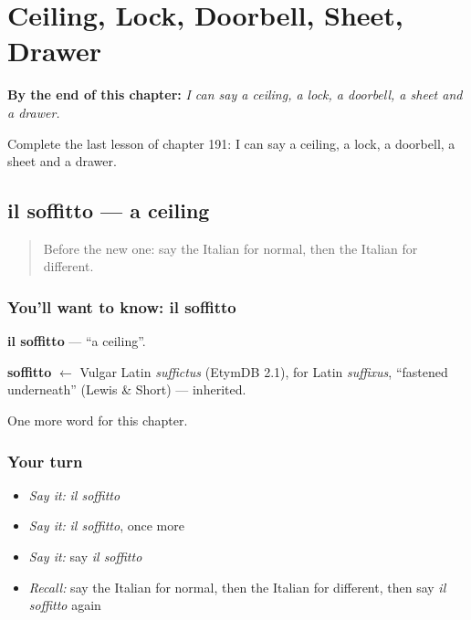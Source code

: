 
\chapter{Ceiling, Lock, Doorbell, Sheet, Drawer}
\label{ch:it-ceiling-lock-doorbell-sheet-drawer}

\begin{chapteropening}
\textbf{By the end of this chapter:} \emph{I can say a ceiling, a lock, a doorbell, a sheet and a drawer.}

Complete the last lesson of chapter 191: I can say a ceiling, a lock, a doorbell, a sheet and a drawer.
\end{chapteropening}

\section[il soffitto]{il soffitto — a ceiling}

\label{lesson:IT-C191-soffitto}



\begin{quote}
Before the new one: say the Italian for normal, then the Italian for different.
\end{quote}

\subsection*{You'll want to know: il soffitto}
\textbf{il soffitto} — \textquotedblleft{}a ceiling\textquotedblright{}.

\begin{cousinweb}
\textbf{soffitto} $\leftarrow$ Vulgar Latin \emph{suffictus} (EtymDB 2.1), for Latin \emph{suffixus}, \textquotedblleft{}fastened underneath\textquotedblright{} (Lewis \& Short) — inherited.
\end{cousinweb}

\begin{grammarlens}[title={What you've built}]
One more word for this chapter.
\end{grammarlens}

\subsection*{Your turn}
\begin{itemize}
\raggedright
  \item \emph{Say it:} \emph{il soffitto}
  \item \emph{Say it:} \emph{il soffitto}, once more
  \item \emph{Say it:} say \emph{il soffitto}
  \item \emph{Recall:} say the Italian for normal, then the Italian for different, then say \emph{il soffitto} again
\end{itemize}

